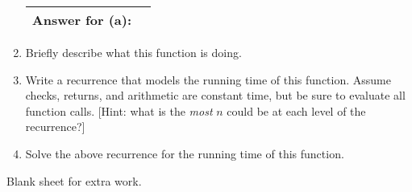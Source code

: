 \documentclass[11pt]{article}
\begin{document}
\begin{problems}
\begin{enumerate}
\vspace{.5in}
\begin{table}[!h]  \flushright \renewcommand{\arraystretch}{2}  \begin{tabular}{|l|c| } \hline
Answer for (a): & \hspace{2in} \\
\hline \end{tabular} \end{table}
\item Briefly describe what this function is doing.
\vspace{1in}
\item Write a recurrence that models the running time of this function. 
Assume checks, returns, and arithmetic are constant time, but be sure to 
evaluate all function calls. [Hint: what is the \emph{most} $n$ could be 
at each level of the recurrence?]
\vspace{1in}
\item Solve the above recurrence for the running time of this function.
\vspace{1in}
\end{enumerate}

%



\end{problems}

\newpage

Blank sheet for extra work.
\end{document}
